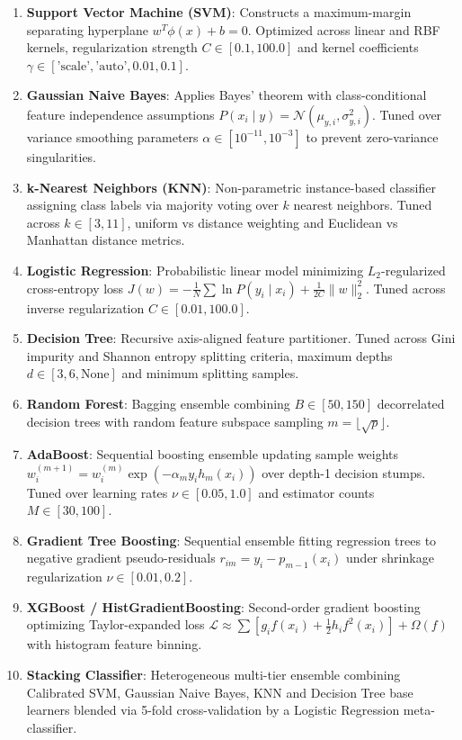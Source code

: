 \documentclass[12pt,a4paper]{article}
\begin{document}
\begin{enumerate}
\item \textbf{Support Vector Machine (SVM)}: Constructs a maximum-margin separating hyperplane $w^T \phi(x) + b = 0$. Optimized across linear and RBF kernels, regularization strength $C \in [0.1, 100.0]$ and kernel coefficients $\gamma \in [\text{'scale'}, \text{'auto'}, 0.01, 0.1]$.
\item \textbf{Gaussian Naive Bayes}: Applies Bayes' theorem with class-conditional feature independence assumptions $P(x_i \mid y) = \mathcal{N}(\mu_{y,i}, \sigma_{y,i}^2)$. Tuned over variance smoothing parameters $\alpha \in [10^{-11}, 10^{-3}]$ to prevent zero-variance singularities.
\item \textbf{k-Nearest Neighbors (KNN)}: Non-parametric instance-based classifier assigning class labels via majority voting over $k$ nearest neighbors. Tuned across $k \in [3, 11]$, uniform vs distance weighting and Euclidean vs Manhattan distance metrics.
\item \textbf{Logistic Regression}: Probabilistic linear model minimizing $L_2$-regularized cross-entropy loss $J(w) = -\frac{1}{N}\sum \ln P(y_i \mid x_i) + \frac{1}{2C}\|w\|_2^2$. Tuned across inverse regularization $C \in [0.01, 100.0]$.
\item \textbf{Decision Tree}: Recursive axis-aligned feature partitioner. Tuned across Gini impurity and Shannon entropy splitting criteria, maximum depths $d \in [3, 6, \text{None}]$ and minimum splitting samples.
\item \textbf{Random Forest}: Bagging ensemble combining $B \in [50, 150]$ decorrelated decision trees with random feature subspace sampling $m = \lfloor \sqrt{p} \rfloor$.
\item \textbf{AdaBoost}: Sequential boosting ensemble updating sample weights $w_i^{(m+1)} = w_i^{(m)} \exp(-\alpha_m y_i h_m(x_i))$ over depth-1 decision stumps. Tuned over learning rates $\nu \in [0.05, 1.0]$ and estimator counts $M \in [30, 100]$.
\item \textbf{Gradient Tree Boosting}: Sequential ensemble fitting regression trees to negative gradient pseudo-residuals $r_{im} = y_i - p_{m-1}(x_i)$ under shrinkage regularization $\nu \in [0.01, 0.2]$.
\item \textbf{XGBoost / HistGradientBoosting}: Second-order gradient boosting optimizing Taylor-expanded loss $\mathcal{L} \approx \sum [g_i f(x_i) + \frac{1}{2} h_i f^2(x_i)] + \Omega(f)$ with histogram feature binning.
\item \textbf{Stacking Classifier}: Heterogeneous multi-tier ensemble combining Calibrated SVM, Gaussian Naive Bayes, KNN and Decision Tree base learners blended via 5-fold cross-validation by a Logistic Regression meta-classifier.
\end{enumerate}
\end{document}
